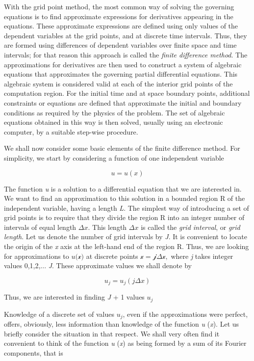 With the grid point method, the most common way of solving the governing
equations is to find approximate expressions for derivatives appearing
in the equations. These approximate expressions are defined using only
values of the dependent variables at the grid points, and at discrete
time intervals. Thus, they are formed using differences of dependent
variables over finite space and time intervals; for that reason this
approach is called the \emph{finite difference method}. The
approximations for derivatives are then used to construct a system of
algebraic equations that approximates the governing partial differential
equations. This algebraic system is considered valid at each of the
interior grid points of the computation region. For the initial time and
at space boundary points, additional constraints or equations are
defined that approximate the initial and boundary conditions as
required by the physics of the problem. The set of algebraic equations
obtained in this way is then solved, usually using an electronic
computer, by a suitable step-wise procedure.

We shall now consider some basic elements of the finite difference
method. For simplicity, we start by considering a function of one
independent variable

\[u = u(x)\]

The function \emph{u} is a solution to a differential equation that we
are interested in. We want to find an approximation to this solution in
a bounded region R of the independent variable, having a length
\emph{L}. The simplest way of introducing a set of grid points is to
require that they divide the region R into an integer number of
intervals of equal length \(\Delta x\). This length \(\Delta x\) is
called the \emph{grid interval}, or \emph{grid length}. Let us denote
the number of grid intervals by \emph{J}. It is convenient to locate the
origin of the \emph{x} axis at the left-hand end of the region R. Thus,
we are looking for approximations to \(u (\mathcal{x)}\) at discrete
points \(\mathcal{x = j}\Delta\mathcal{x, }\) where \emph{j} takes
integer values 0,1,2,... \emph{J}. These approximate values we shall
denote by

\[u_j = u_j(j \Delta x)\]

Thus, we are interested in finding \emph{J} + 1 values \(u_ j\)

Knowledge of a discrete set of values \(u_j\), even if the
approximations were perfect, offers, obviously, less information than
knowledge of the function \emph{u} (\emph{x}). Let us briefly consider
the situation in that respect. We shall very often find it convenient to
think of the function \emph{u} (\emph{x}) as being formed by a sum of
its Fourier components, that is

